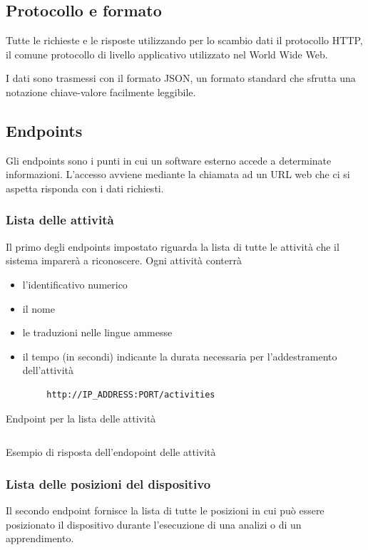 \subsection{Protocollo e formato}
Tutte le richieste e le risposte utilizzando per lo scambio dati il protocollo HTTP, il comune protocollo di livello 
applicativo utilizzato nel World Wide Web.

I dati sono trasmessi con il formato JSON, un formato standard che sfrutta una notazione chiave-valore facilmente leggibile.


\subsection{Endpoints}
Gli endpoints sono i punti in cui un software esterno accede a determinate informazioni. L'accesso avviene mediante la chiamata ad un URL 
web che ci si aspetta risponda con i dati richiesti.

\subsubsection{Lista delle attività}
Il primo degli endpoints impostato riguarda la lista di tutte le attività che il sistema imparerà a riconoscere.
Ogni attività conterrà
\begin{itemize}
    \item l'identificativo numerico
    \item il nome
    \item le traduzioni nelle lingue ammesse
    \item il tempo (in secondi) indicante la durata necessaria per l'addestramento dell'attività
\end{itemize}

\begin{listing}[H] 
    \begin{verbatim}
        http://IP_ADDRESS:PORT/activities
    \end{verbatim}
    \caption{Endpoint per la lista delle attività}
    \label{listing:endpoint-activities}
\end{listing}
\begin{listing}[H] 
    \inputminted[frame=single,framesep=10pt]{json}{assets/snippets/server/api/activities.json}
    \caption{Esempio di risposta dell'endopoint delle attività}
\end{listing}

\subsubsection{Lista delle posizioni del dispositivo}
Il secondo endpoint fornisce la lista di tutte le posizioni in cui può essere posizionato il dispositivo durante l'esecuzione 
di una analizi o di un apprendimento.

